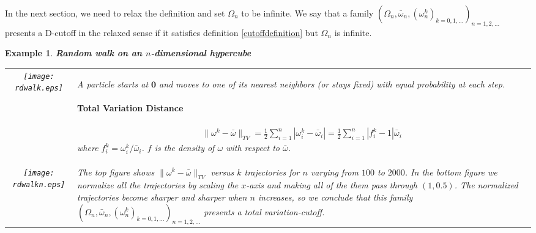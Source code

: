 \documentclass[landscape,a0b,final]{a0poster}
\newtheorem{example}{Example}
\newenvironment{poster}{
  \begin{center}
  \begin{minipage}[c]{0.98\textwidth}
}{
  \end{minipage} 
  \end{center}
}
\newenvironment{pcolumn}[1]{
  \begin{minipage}{#1\textwidth}
  \begin{center}
}{
  \end{center}
  \end{minipage}
}
\begin{document}
\begin{poster}
\begin{center}
\begin{pcolumn}{0.32}
{In the next section, we need to relax the definition and set $\Omega_n$ to be infinite. We say that a family $(\Omega_n,\bar{\omega}_n, (\omega^k_n)_{k=0,1,...})_{n=1,2,...}$ presents a D-cutoff in the relaxed sense if it satisfies definition \ref{cutoffdefinition} but $\Omega_n$ is infinite. 

\begin{example} \textbf{Random walk on an $n$-dimensional hypercube}
 
\vspace{0.3cm}
\begin{tabular}{c|l}
  \texttt{[image: rdwalk.eps]} &
\begin{minipage}[b]{0.58\hsize}
A particle starts at $\mathbf{0}$ and moves to one of its nearest neighbors (or stays fixed) with equal probability at each step.
\vspace{-1cm}
\paragraph{Total Variation Distance}
  \begin{eqnarray*}
   \|\omega^k - \bar{\omega}\|_{TV} = \frac{1}{2}\sum_{i=1}^n |\omega_i^k-\bar{\omega}_i |= \frac{1}{2}\sum_{i=1}^n |f_i^k-1|\bar{\omega}_i
  \end{eqnarray*}
  where $f^k_i = \omega_i^k/\bar{\omega}_i$. $f$ is the density of $\omega$ with respect to $\bar{\omega}$.
\end{minipage}
\\
\texttt{[image: rdwalkn.eps]} &
\begin{minipage}[b]{0.58\hsize}
The top figure shows $\|\omega^k - \bar{\omega}\|_{TV}$ versus $k$ trajectories for $n$ varying from $100$ to $2000$. In the bottom figure we normalize all the trajectories by scaling the $x$-axis and making all of the them pass through $(1, 0.5)$. The normalized trajectories become sharper and sharper when $n$ increases, so we conclude that this family $(\Omega_n,\bar{\omega}_n, (\omega^k_n)_{k=0,1,...})_{n=1,2,...}$ presents a total variation-cutoff.
\end{minipage}
\end{tabular}

\end{example}







}
\end{pcolumn}
\end{center}
\end{poster}
\end{document}
